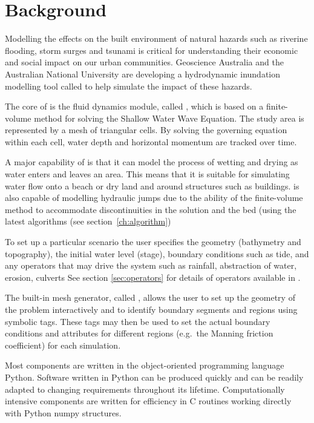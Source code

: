 \documentclass{manual}
\begin{document}
\pagebreak


\section{Background}

Modelling the effects on the built environment of natural hazards such
as riverine flooding, storm surges and tsunami is critical for
understanding their economic and social impact on our urban
communities.  Geoscience Australia and the Australian National
University are developing a hydrodynamic inundation modelling tool
called \anuga to help simulate the impact of these hazards.

The core of \anuga is the fluid dynamics module, called ,
which is based on a finite-volume method for solving the Shallow Water
Wave Equation.  The study area is represented by a mesh of triangular
cells.  By solving the governing equation within each cell, water
depth and horizontal momentum are tracked over time.

A major capability of \anuga is that it can model the process of
wetting and drying as water enters and leaves an area.  This means
that it is suitable for simulating water flow onto a beach or dry land
and around structures such as buildings.  \anuga is also capable
of modelling hydraulic jumps due to the ability of the finite-volume
method to accommodate discontinuities in the solution and the bed (using the
latest algorithms (see section~\ref{ch:algorithm})

To set up a particular scenario the user specifies the geometry
(bathymetry and topography), the initial water level (stage),
boundary conditions such as tide, and any operators  that may
drive the system such as rainfall, abstraction of water,  erosion, culverts
See section \ref{sec:operators} for details of operators available in \anuga.

The built-in mesh generator, called ,
allows the user to set up the geometry
of the problem interactively and to identify boundary segments and
regions using symbolic tags.  These tags may then be used to set the
actual boundary conditions and attributes for different regions
(e.g.\ the Manning friction coefficient) for each simulation.

Most \anuga components are written in the object-oriented programming
language Python.  Software written in Python can be produced quickly
and can be readily adapted to changing requirements throughout its
lifetime.  Computationally intensive components are written for
efficiency in C routines working directly with Python numpy
structures.
\end{document}
